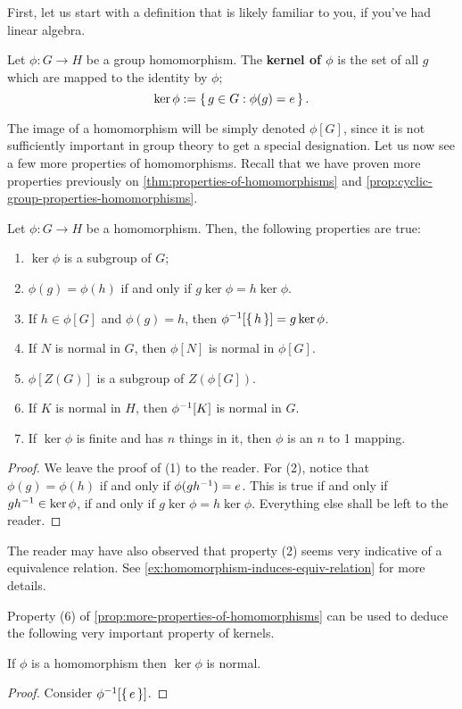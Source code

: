 \documentclass[./main.tex]{subfiles}
\begin{document}
First, let us start with a definition that is likely familiar to you, if you've
had linear algebra.
\begin{definition}
    Let $\phi: G \to H$ be a group homomorphism. The \textbf{kernel of $\phi$}
    is the set of all $g$ which are mapped to the identity by $\phi$;
    \[
        \ker \phi := \set{g \in G: \phi(g) = e}.
    \]
\end{definition}
The image of a homomorphism will be simply denoted $\phi[G]$, since it is not
sufficiently important in group theory to get a special designation. Let us now
see a few more properties of homomorphisms. Recall that we have proven more
properties previously on \cref{thm:properties-of-homomorphisms} and
\cref{prop:cyclic-group-properties-homomorphisms}.
\begin{proposition}
\label{prop:more-properties-of-homomorphisms}
    Let $\phi: G \to H$ be a homomorphism. 
    Then, the following properties are true:
    \begin{enumerate}
        \item $\ker \phi$ is a subgroup of $G$; 
        \item $\phi(g) = \phi(h)$ if and only if $g \ker \phi = h \ker \phi$.
        \item If $h \in \phi[G]$ and $\phi(g) = h$, then $\phi\inv\paren*{\set{h}} = g\ker\phi$. 
        \item If $N$ is normal in $G$, then $\phi[N]$ is normal in $\phi[G]$.
        \item $\phi[Z(G)]$ is a subgroup of $Z(\phi[G])$.
        \item If $K$ is normal in $H$, then $\phi\inv\paren*{K}$ is normal in $G$.
        \item If $\ker \phi$ is finite and has $n$ things in it, then $\phi$ is an $n$ to 1 mapping.
    \end{enumerate}
\end{proposition}
\begin{proof}
    We leave the proof of (1) to the reader. For (2), notice that $\phi(g) =
    \phi(h)$ if and only if $\phi(gh^{-1}) = e$. This is true if and only if
    $gh^{-1} \in \ker \phi$, if and only if $g\ker \phi = h \ker \phi$.
    Everything else shall be left to the reader.
\end{proof}
The reader may have also observed that property (2) seems very indicative of a
equivalence relation. See \cref{ex:homomorphism-induces-equiv-relation} for more details.

Property (6) of \cref{prop:more-properties-of-homomorphisms} can be used to
deduce the following very important property of kernels.
\begin{corollary}
    If $\phi$ is a homomorphism then $\ker \phi$ is normal.
\end{corollary}
\begin{proof}
    Consider $\phi\inv\paren*{\set{e}}$.
\end{proof}
\end{document}
